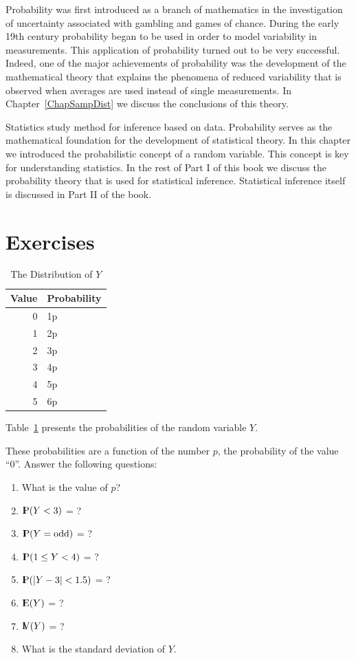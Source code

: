 \documentclass[]{krantz}
\newcommand{\Expec}{{\rm I\kern-.3em E}}
\newcommand{\Prob}{{\rm I\kern-.3em P}}
\newcommand{\Var}{{\rm I\kern-.3em V}}
\theoremstyle{definition}
\theoremstyle{definition}
\theoremstyle{definition}
\theoremstyle{remark}
\let\BeginKnitrBlock\begin \let\EndKnitrBlock\end
\begin{document}
Probability was first introduced as a branch of mathematics in the
investigation of uncertainty associated with gambling and games of
chance. During the early 19th century probability began to be used in
order to model variability in measurements. This application of
probability turned out to be very successful. Indeed, one of the major
achievements of probability was the development of the mathematical
theory that explains the phenomena of reduced variability that is
observed when averages are used instead of single measurements. In
Chapter~\ref{ChapSampDist} we discuss the conclusions of this theory.

Statistics study method for inference based on data. Probability serves
as the mathematical foundation for the development of statistical
theory. In this chapter we introduced the probabilistic concept of a
random variable. This concept is key for understanding statistics. In
the rest of Part I of this book we discuss the probability theory that
is used for statistical inference. Statistical inference itself is
discussed in Part II of the book.

\section{Exercises}\label{exercises-3}

\begin{table}

\caption{\label{tab:tab4}The Distribution of $Y$}
\centering
\begin{tabular}[t]{rl}
\toprule
Value & Probability\\
\midrule
0 & 1p\\
1 & 2p\\
2 & 3p\\
3 & 4p\\
4 & 5p\\
5 & 6p\\
\bottomrule
\end{tabular}
\end{table}

\BeginKnitrBlock{exercise}
\protect\hypertarget{exr:unnamed-chunk-49}{}{\label{exr:unnamed-chunk-49}
}Table~\ref{tab:tab4} presents the probabilities of the random variable
\(Y\).

These probabilities are a function of the number \(p\), the probability
of the value ``0''. Answer the following questions:

\begin{enumerate}
\def\labelenumi{\arabic{enumi}.}
\item
  What is the value of \(p\)?
\item
  \(\Prob(Y <3 )\) = ?
\item
  \(\Prob(Y = \mbox{odd})\) = ?
\item
  \(\Prob(1 \leq Y < 4)\) = ?
\item
  \(\Prob(|Y -3| < 1.5)\) = ?
\item
  \(\Expec(Y)\) = ?
\item
  \(\Var(Y)\) = ?
\item
  What is the standard deviation of \(Y\).
\end{enumerate}
\EndKnitrBlock{exercise}
\end{document}
